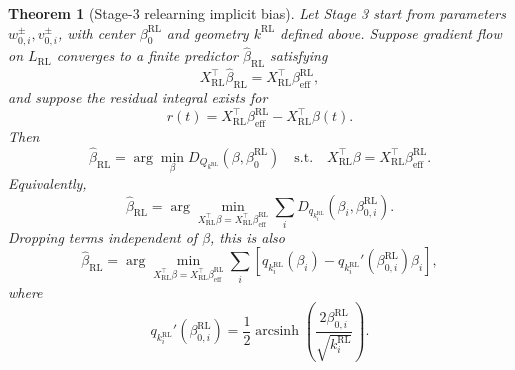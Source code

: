 \documentclass[11pt]{article}
\newtheorem{theorem}{Theorem}
\begin{document}
\begin{theorem}[Stage-3 relearning implicit bias]
\label{thm:stage3-relearning-bias}
Let Stage 3 start from parameters \(w_{0,i}^{\pm},v_{0,i}^{\pm}\), with center \(\beta_0^{\mathrm{RL}}\) and geometry \(k^{\mathrm{RL}}\) defined above. Suppose gradient flow on \(L_{\mathrm{RL}}\) converges to a finite predictor \(\widehat\beta_{\mathrm{RL}}\) satisfying
\begin{equation}
    X_{\mathrm{RL}}^\top\widehat\beta_{\mathrm{RL}}
    =
    X_{\mathrm{RL}}^\top\beta_{\mathrm{eff}}^{\mathrm{RL}},
\end{equation}
and suppose the residual integral exists for
\begin{equation}
    r(t)
    =
    X_{\mathrm{RL}}^\top\beta_{\mathrm{eff}}^{\mathrm{RL}}
    -
    X_{\mathrm{RL}}^\top\beta(t).
\end{equation}
Then
\begin{equation}
    \boxed{
    \widehat\beta_{\mathrm{RL}}
    =
    \arg\min_{\beta}
    D_{Q_{k^{\mathrm{RL}}}}
    \left(
        \beta,
        \beta_0^{\mathrm{RL}}
    \right)
    \quad
    \mathrm{s.t.}
    \quad
    X_{\mathrm{RL}}^\top\beta
    =
    X_{\mathrm{RL}}^\top
    \beta_{\mathrm{eff}}^{\mathrm{RL}}.
    }
\end{equation}
Equivalently,
\begin{equation}
    \boxed{
    \widehat\beta_{\mathrm{RL}}
    =
    \arg\min_{
    X_{\mathrm{RL}}^\top\beta
    =
    X_{\mathrm{RL}}^\top\beta_{\mathrm{eff}}^{\mathrm{RL}}
    }
    \sum_i
    D_{q_{k_i^{\mathrm{RL}}}}
    \left(
        \beta_i,
        \beta_{0,i}^{\mathrm{RL}}
    \right).
    }
\end{equation}
Dropping terms independent of \(\beta\), this is also
\begin{equation}
    \widehat\beta_{\mathrm{RL}}
    =
    \arg\min_{
    X_{\mathrm{RL}}^\top\beta
    =
    X_{\mathrm{RL}}^\top\beta_{\mathrm{eff}}^{\mathrm{RL}}
    }
    \sum_i
    \left[
    q_{k_i^{\mathrm{RL}}}(\beta_i)
    -
    q_{k_i^{\mathrm{RL}}}'(\beta_{0,i}^{\mathrm{RL}})\beta_i
    \right],
\end{equation}
where
\begin{equation}
    q_{k_i^{\mathrm{RL}}}'(\beta_{0,i}^{\mathrm{RL}})
    =
    \frac12
    \operatorname{arcsinh}
    \left(
        \frac{2\beta_{0,i}^{\mathrm{RL}}}{\sqrt{k_i^{\mathrm{RL}}}}
    \right).
\end{equation}
\end{theorem}
\end{document}
